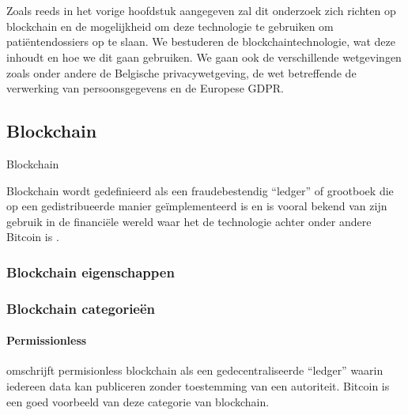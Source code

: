 \chapter{}
\label{ch:stand-van-zaken}

Zoals reeds in het vorige hoofdstuk aangegeven zal dit onderzoek zich richten op blockchain en de mogelijkheid om deze technologie te gebruiken om patiëntendossiers op te slaan. We bestuderen de blockchaintechnologie, wat deze inhoudt en hoe we dit gaan gebruiken. We gaan ook de verschillende wetgevingen zoals onder andere de Belgische privacywetgeving, de wet betreffende de verwerking van persoonsgegevens en de Europese GDPR.
\section{Blockchain}
\label{ch:blockchain}

Blockchain 

Blockchain wordt gedefinieerd als een fraudebestendig ``ledger'' of grootboek die op een gedistribueerde manier geïmplementeerd is \autocite{Yaga2018} en is vooral bekend van zijn gebruik in de financiële wereld waar het de technologie achter onder andere Bitcoin is \autocite{Nofer2017}.

\subsection{Blockchain eigenschappen}

\subsection{Blockchain categorieën}

\subsubsection{Permissionless}

\textcite{Yaga2018} omschrijft permisionless blockchain als een gedecentraliseerde ``ledger'' waarin iedereen data kan publiceren zonder toestemming van een autoriteit. Bitcoin is een goed voorbeeld van deze categorie van blockchain.

